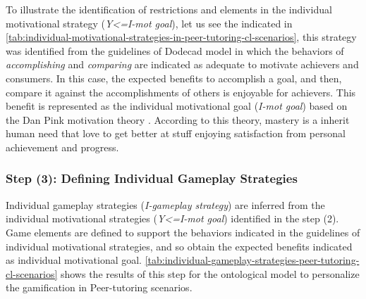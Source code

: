 To illustrate the identification of restrictions and elements in the individual motivational strategy (\emph{Y<=I-mot goal}), let us see the  indicated in \autoref{tab:individual-motivational-strategies-in-peer-tutoring-cl-scenarios}, this strategy was identified from the guidelines of Dodecad model in which the behaviors of \emph{accomplishing} and \emph{comparing} are indicated as adequate to motivate achievers and consumers. In this case, the expected benefits to accomplish a goal, and then, compare it against the accomplishments of others is enjoyable for achievers. This benefit is represented as the individual motivational goal  (\emph{I-mot goal}) based on the Dan Pink motivation theory \cite{Pink2011}. According to this theory, mastery is a inherit human need that love to get better at stuff enjoying satisfaction from personal achievement and progress.
 
\subsubsection*{Step (3): Defining Individual Gameplay Strategies}

Individual gameplay strategies (\emph{I-gameplay strategy}) are inferred from the individual motivational strategies (\emph{Y<=I-mot goal}) identified in the step (2). Game elements are defined to support the behaviors indicated in the guidelines of individual motivational strategies, and so obtain the expected benefits indicated as individual motivational goal. \autoref{tab:individual-gameplay-strategies-peer-tutoring-cl-scenarios} shows the results of this step for the ontological model to personalize the gamification in Peer-tutoring scenarios.



